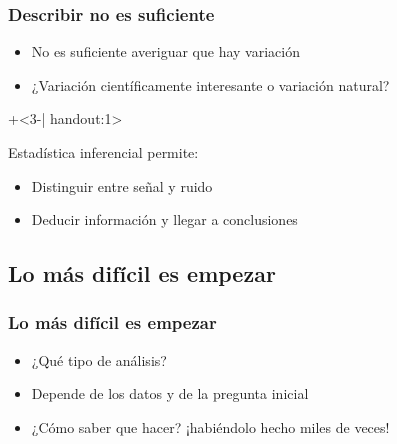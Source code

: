 \documentclass[mathserif]{beamer}
\begin{document}
\begin{frame}[label=infer]
\frametitle{Describir no es suficiente}
 \begin{itemize}[<1-| uncover@+-| handout:1>]
   \item No es suficiente averiguar que hay variaci\'on
   \item ¿Variaci\'on cient\'ificamente interesante o variaci\'on natural?
\end{itemize}
\bigskip
\onslide+<3-| handout:1>{%
\begin{beamerboxesrounded}[]{Estad\'istica \alert{inferencial} permite:}
  \begin{itemize}
     \item Distinguir entre señal y ruido
     \item Deducir informaci\'on y llegar a conclusiones
  \end{itemize}
\end{beamerboxesrounded}
}%
\end{frame}%


\subsection[¿C\'omo empezar?]{Lo m\'as dif\'icil es empezar}

\begin{frame}[label=getstart]
\frametitle{Lo m\'as dif\'icil es empezar}
  \begin{itemize}[<+-| handout:1>]
    \item  ¿Qu\'e tipo de an\'alisis?
    \item Depende de los datos y de la pregunta inicial
    \item  ¿C\'omo saber que hacer? ¡habi\'endolo hecho miles de veces!
  \end{itemize}
\end{frame}%
\end{document}
